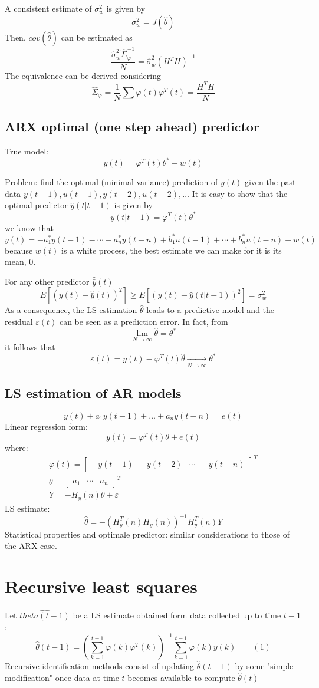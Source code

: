 \documentclass{book}
\begin{document}
A consistent estimate of $\sigma_w^2$ is given by
\[
    \sigma_w^2=J(\hat{\theta})
\]
Then, $cov(\hat{\theta})$ can be estimated as
\[
    \frac{\hat{\sigma}_w^2\hat{\Sigma}_{\varphi}^{-1}}{N} = \hat{\sigma}_w^2(H^TH)^{-1}
\]
The equivalence can be derived considering
\[
    \hat{\Sigma}_{\varphi}=\frac{1}{N}\sum \varphi(t)\varphi^T(t)=\frac{H^TH}{N}
\]
\subsection{ARX optimal (one step ahead) predictor}
True model:
\[
    y(t)=\varphi^T(t)\theta^*+w(t)
\]

Problem: find the optimal (minimal variance) prediction of $y(t)$ given the past data $y(t-1),u(t-1),y(t-2),u(t-2),\dots$
It is easy to show that the optimal predictor $\hat{y}(t|t-1)$ is given by
\[
    y(t|t-1)=\varphi^T(t)\theta^*
\]
we know that
\[
    y(t)=-a_1^*y(t-1)-\cdots-a_n^*y(t-n)+b_1^*u(t-1)+\cdots+b_n^*u(t-n)+w(t)
\]
because $w(t)$ is a white process, the best estimate we can make for it is its mean, $0$.

For any other predictor $\hat{\bar{y}}(t)$
\[
    E[(y(t)-\hat{\bar{y}}(t))^2]\geq E[(y(t)-\hat{y}(t|t-1))^2]=\sigma_w^2
\]
As a consequence, the LS estimation $\hat{\theta}$ leads to a predictive model and the residual $\varepsilon(t)$ can be seen as a prediction error. In fact, from
\[
    \lim_{N\to\infty}\hat{\theta}=\theta^*
\]
it follows that
\[
    \varepsilon(t)=y(t)-\varphi^T(t)\hat{\theta}\xrightarrow[N\to\infty]{} \theta^*
\]
\subsection{LS estimation of AR models}
\[
    y(t)+a_1y(t-1)+\dots+a_ny(t-n)=e(t)
\]
Linear regression form:
\[
    y(t)=\varphi^T(t)\theta+e(t)
\]
where:
\begin{gather*}
    \varphi(t)=\begin{bmatrix}
        -y(t-1) & -y(t-2) & \cdots & -y(t-n)
    \end{bmatrix}^T\\
    \theta=\begin{bmatrix} a_1 & \cdots & a_n \end{bmatrix}^T\\
    Y= -H_y(n)\theta+\varepsilon
\end{gather*}
LS estimate:
\[
    \hat{\theta}=-(H_y^T(n)H_y(n))^{-1}H_y^T(n)Y
\]
Statistical properties and optimale predictor: similar considerations to those of the ARX case.
\section{Recursive least squares}
Let $\hat{theta(t-1)}$ be a LS estimate obtained form data collected up to time $t-1$:
\[
    \hat{\theta}(t-1)=\left(\sum_{k=1}^{t-1}\varphi(k)\varphi^T(k)\right)^{-1} \sum_{k=1}^{t-1}\varphi(k)y(k) \qquad(1)
\]
Recursive identification methods consist of updating $\hat{\theta}(t-1)$ by some "simple modification" once data at time $t$ becomes available to compute $\hat{\theta}(t)$
\end{document}
